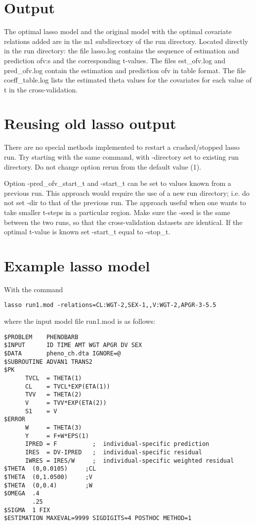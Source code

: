 \section{Output}

The optimal lasso model and the original model with the optimal covariate relations added are in the m1 subdirectory of the run directory. Located directly in the run directory: the file lasso.log contains the sequence of estimation and prediction ofv:s and the corresponding t-values. The files est\_ofv.log and pred\_ofv.log contain the estimation and prediction ofv in table format. The file coeff\_table.log lists the estimated theta values for the covariates for each value of t in the cross-validation.

\section{Reusing old lasso output}

There are no special methods implemented to restart a crashed/stopped lasso run. Try starting with the same command, with -directory set to existing run directory. Do not change option rerun from the default value (1).

Option -pred\_ofv\_start\_t and -start\_t can be set to values known from a previous run. This approach would require the use of a new run directory; i.e. do not set -dir to that of the previous run. The approach useful when one wants to take smaller t-steps in a particular region. Make sure the -seed is the same between the two runs, so that the cross-validation datasets are identical. If the optimal t-value is known set -start\_t equal to -stop\_t. 

\section{Example lasso model}

With the command
\begin{verbatim}
lasso run1.mod -relations=CL:WGT-2,SEX-1,,V:WGT-2,APGR-3-5.5
\end{verbatim}

where the input model file run1.mod is as follows:

\begin{verbatim}
$PROBLEM    PHENOBARB 
$INPUT      ID TIME AMT WGT APGR DV SEX
$DATA       pheno_ch.dta IGNORE=@
$SUBROUTINE ADVAN1 TRANS2
$PK
      TVCL  = THETA(1)
      CL    = TVCL*EXP(ETA(1))
      TVV   = THETA(2)
      V     = TVV*EXP(ETA(2))
      S1    = V
$ERROR      
      W     = THETA(3)
      Y     = F+W*EPS(1)
      IPRED = F          ;  individual-specific prediction
      IRES  = DV-IPRED   ;  individual-specific residual
      IWRES = IRES/W     ;  individual-specific weighted residual
$THETA  (0,0.0105)     ;CL
$THETA  (0,1.0500)     ;V
$THETA  (0,0.4)        ;W
$OMEGA  .4
        .25
$SIGMA  1 FIX
$ESTIMATION MAXEVAL=9999 SIGDIGITS=4 POSTHOC METHOD=1
\end{verbatim}

